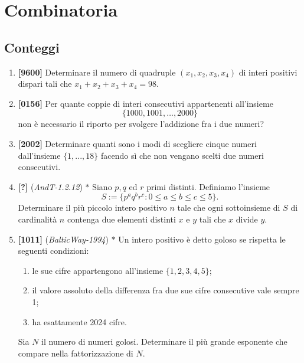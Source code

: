 \documentclass[10pt]{article}
\begin{document}
\pagestyle{fancy}
\fancyhf{}
\fancyhead[R]{\nouppercase{\leftmark}}


\section{Combinatoria}

\subsection{Conteggi}
\begin{enumerate}
    \item \textbf{[9600]} Determinare il numero di quadruple $(x_1,x_2,x_3,x_4)$ di interi positivi dispari tali che $x_1+x_2+x_3+x_4=98$.

    \item \textbf{[0156]} Per quante coppie di interi consecutivi appartenenti all'insieme
        \begin{equation*}
            \{1000,1001,\dots,2000\}
        \end{equation*}
        non è necessario il riporto per svolgere l'addizione fra i due numeri?

    \item \textbf{[2002]} Determinare quanti sono i modi di scegliere cinque numeri dall'insieme $\{1,...,18 \}$ facendo sì che non vengano scelti due numeri consecutivi.

    \item \textbf{[?]} (\textit{AndT-1.2.12}) $\ast$ Siano $p,q$ ed $r$ primi distinti. Definiamo l'insieme
    \begin{equation*}
        S:=\{p^a q^b r^c : 0\le a \le b \le c \le 5\}.
    \end{equation*}
    Determinare il più piccolo intero positivo $n$ tale che ogni sottoinsieme di $S$ di cardinalità $n$ contenga due elementi distinti $x$ e $y$ tali che $x$ divide $y$.

    \item \textbf{[1011]} (\textit{BalticWay-1994}) $\ast$ Un intero positivo è detto goloso se rispetta le seguenti condizioni:
    \begin{enumerate}
        \item le sue cifre appartengono all'insieme $\{ 1,2,3,4,5 \}$;
        \item il valore assoluto della differenza fra due sue cifre consecutive vale sempre 1;
        \item ha esattamente 2024 cifre.
    \end{enumerate}
    Sia $N$ il numero di numeri golosi. Determinare il più grande esponente che compare nella fattorizzazione di $N$.
    
\end{enumerate}
\end{document}
